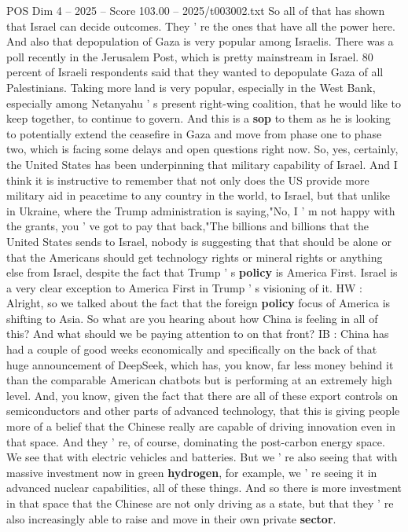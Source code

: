 \begin{textsample}{POS Dim 4 – 2025 – Score 103.00 – 2025/t003002.txt}
So all of that has shown that Israel can decide outcomes.
They ' re the ones that have all the power here.
And also that depopulation of Gaza is very popular among Israelis.
There was a poll recently in the Jerusalem Post, which is pretty mainstream in Israel. 80 percent of Israeli respondents said that they wanted to depopulate Gaza of all Palestinians.
Taking more land is very popular, especially in the West Bank, especially among Netanyahu ' s present right-wing coalition, that he would like to keep together, to continue to govern.
And this is a \textbf{sop} to them as he is looking to potentially extend the ceasefire in Gaza and move from phase one to phase two, which is facing some delays and open questions right now.
So, yes, certainly, the United States has been underpinning that military capability of Israel.
And I think it is instructive to remember that not only does the US provide more military aid in peacetime to any country in the world, to Israel, but that unlike in Ukraine, where the Trump administration is saying,"No, I ' m not happy with the grants, you ' ve got to pay that back,"The billions and billions that the United States sends to Israel, nobody is suggesting that that should be alone or that the Americans should get technology rights or mineral rights or anything else from Israel, despite the fact that Trump ' s \textbf{policy} is America First.
Israel is a very clear exception to America First in Trump ' s visioning of it.
HW : Alright, so we talked about the fact that the foreign \textbf{policy} focus of America is shifting to Asia.
So what are you hearing about how China is feeling in all of this?
And what should we be paying attention to on that front?
IB : China has had a couple of good weeks economically and specifically on the back of that huge announcement of DeepSeek, which has, you know, far less money behind it than the comparable American chatbots but is performing at an extremely high level.
And, you know, given the fact that there are all of these export controls on semiconductors and other parts of advanced technology, that this is giving people more of a belief that the Chinese really are capable of driving innovation even in that space.
And they ' re, of course, dominating the post-carbon energy space.
We see that with electric vehicles and batteries.
But we ' re also seeing that with massive investment now in green \textbf{hydrogen}, for example, we ' re seeing it in advanced nuclear capabilities, all of these things.
And so there is more investment in that space that the Chinese are not only driving as a state, but that they ' re also increasingly able to raise and move in their own private \textbf{sector}.

\end{textsample}
